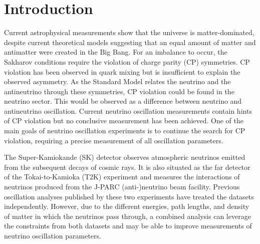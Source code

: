 \chapter{Introduction}
\label{chap:Introduction}

Current astrophysical measurements show that the universe is matter-dominated, despite current theoretical models suggesting that an equal amount of matter and antimatter were created in the Big Bang.
For an imbalance to occur, the Sakharov conditions \cite{Sakharov1991} require the violation of charge parity (CP) symmetries.
CP violation has been observed in quark mixing but is insufficient to explain the observed asymmetry.
As the Standard Model relates the neutrino and the antineutrino through these symmetries, CP violation could be found in the neutrino sector.
This would be observed as a difference between neutrino and antineutrino oscillation.
Current neutrino oscillation measurements contain hints of CP violation \cite{Dunne2020-uf} but no conclusive measurement has been achieved.
One of the main goals of neutrino oscillation experiments is to continue the search for CP violation, requiring a precise measurement of all oscillation parameters.

The Super-Kamiokande (SK) detector observes atmospheric neutrinos emitted from the subsequent decays of cosmic rays. It is also situated as the far detector of the Tokai-to-Kamioka (T2K) experiment and measures the interactions of neutrinos produced from the J-PARC (anti-)neutrino beam facility. Previous oscillation analyses published by these two experiments have treated the datasets independently. However, due to the different energies, path lengths, and density of matter in which the neutrinos pass through, a combined analysis can leverage the constraints from both datasets and may be able to improve measurements of neutrino oscillation parameters.

